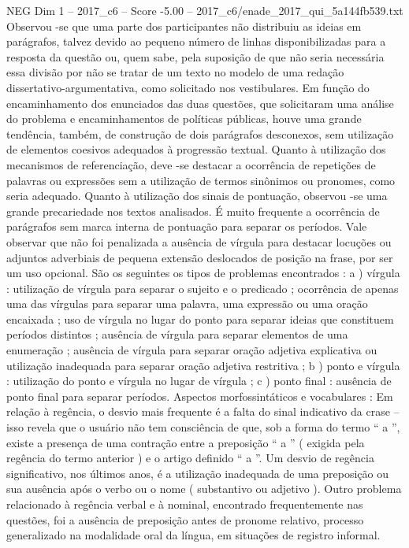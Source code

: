\begin{textsample}{NEG Dim 1 – 2017\_c6 – Score -5.00 – 2017\_c6/enade\_2017\_qui\_5a144fb539.txt}
Observou -se que uma parte dos participantes não distribuiu as ideias em parágrafos, talvez devido ao pequeno número de linhas disponibilizadas para a resposta da questão ou, quem sabe, pela suposição de que não seria necessária essa divisão por não se tratar de um texto no modelo de uma redação dissertativo-argumentativa, como solicitado nos vestibulares.
Em função do encaminhamento dos enunciados das duas questões, que solicitaram uma análise do problema e encaminhamentos de políticas públicas, houve uma grande tendência, também, de construção de dois parágrafos desconexos, sem utilização de elementos coesivos adequados à progressão textual.
Quanto à utilização dos mecanismos de referenciação, deve -se destacar a ocorrência de repetições de palavras ou expressões sem a utilização de termos sinônimos ou pronomes, como seria adequado.
Quanto à utilização dos sinais de pontuação, observou -se uma grande precariedade nos textos analisados.
É muito frequente a ocorrência de parágrafos sem marca interna de pontuação para separar os períodos.
Vale observar que não foi penalizada a ausência de vírgula para destacar locuções ou adjuntos adverbiais de pequena extensão deslocados de posição na frase, por ser um uso opcional.
São os seguintes os tipos de problemas encontrados : a ) vírgula : utilização de vírgula para separar o sujeito e o predicado ; ocorrência de apenas uma das vírgulas para separar uma palavra, uma expressão ou uma oração encaixada ; uso de vírgula no lugar do ponto para separar ideias que constituem períodos distintos ; ausência de vírgula para separar elementos de uma enumeração ; ausência de vírgula para separar oração adjetiva explicativa ou utilização inadequada para separar oração adjetiva restritiva ; b ) ponto e vírgula : utilização do ponto e vírgula no lugar de vírgula ; c ) ponto final : ausência de ponto final para separar períodos.
Aspectos morfossintáticos e vocabulares : Em relação à regência, o desvio mais frequente é a falta do sinal indicativo da crase – isso revela que o usuário não tem consciência de que, sob a forma do termo “ a ”, existe a presença de uma contração entre a preposição “ a ” ( exigida pela regência do termo anterior ) e o artigo definido “ a ”.
Um desvio de regência significativo, nos últimos anos, é a utilização inadequada de uma preposição ou sua ausência após o verbo ou o nome ( substantivo ou adjetivo ).
Outro problema relacionado à regência verbal e à nominal, encontrado frequentemente nas questões, foi a ausência de preposição antes de pronome relativo, processo generalizado na modalidade oral da língua, em situações de registro informal.

\end{textsample}

